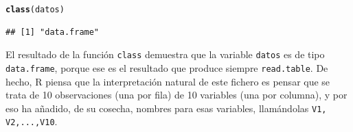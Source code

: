 \documentclass[10pt,a4paper]{article}\usepackage[]{graphicx}\usepackage[]{color}
\makeatletter
\newcommand{\hlstd}[1]{\textcolor[rgb]{0.345,0.345,0.345}{#1}}%
\newcommand{\hlkwd}[1]{\textcolor[rgb]{0.737,0.353,0.396}{\textbf{#1}}}%
\newenvironment{kframe}{%
 \def\at@end@of@kframe{}%
 \ifinner\ifhmode%
  \def\at@end@of@kframe{\end{minipage}}%
  \begin{minipage}{\columnwidth}%
 \fi\fi%
 \def\FrameCommand##1{\hskip\@totalleftmargin \hskip-\fboxsep
 \colorbox{shadecolor}{##1}\hskip-\fboxsep
     \hskip-\linewidth \hskip-\@totalleftmargin \hskip\columnwidth}%
 \MakeFramed {\advance\hsize-\width
   \@totalleftmargin\z@ \linewidth\hsize
   \@setminipage}}%
 {\par\unskip\endMakeFramed%
 \at@end@of@kframe}
\newenvironment{knitrout}{}{} %
\makeatother
\begin{document}
\vspace{-0.7cm}
\begin{knitrout}
\color{fgcolor}\begin{kframe}
\begin{alltt}
\hlkwd{class}\hlstd{(datos)}
\end{alltt}
\begin{verbatim}
## [1] "data.frame"
\end{verbatim}
\end{kframe}
\end{knitrout}
El resultado de la función {\tt class} demuestra que la variable {\tt datos} es de tipo {\tt data.frame}, porque ese es el resultado que produce siempre {\tt read.table}. De hecho, R piensa que la interpretación natural de este fichero es pensar que se trata de 10 observaciones (una por fila) de 10 variables (una por columna), y por eso ha añadido, de su cosecha, nombres para esas variables, llamándolas {\tt V1, V2,...,V10}.
\end{document}
